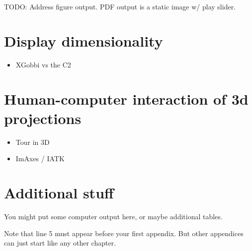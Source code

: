\documentclass{monashthesis}
\begin{document}
TODO: Address figure output. PDF output is a static image w/ play
slider.

\chapter{Display dimensionality}\label{ch:disp_dim}

\begin{itemize}
\tightlist
\item
  XGobbi vs the C2
\end{itemize}

\chapter{Human-computer interaction of 3d
projections}\label{ch:hci_3dproj}

\begin{itemize}
\tightlist
\item
  Tour in 3D
\item
  ImAxes / IATK
\end{itemize}

\appendix

\chapter{Additional stuff}\label{additional-stuff}

You might put some computer output here, or maybe additional tables.

Note that line 5 must appear before your first appendix. But other
appendices can just start like any other chapter.

\printbibliography[heading=bibintoc]
\end{document}
